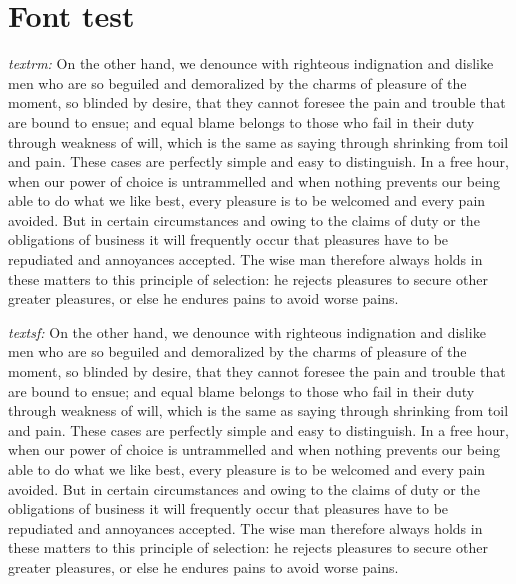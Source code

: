 \chapter*{Font test}

\emph{textrm:}
\textrm{On the other hand, we denounce with righteous indignation and
  dislike men who are so beguiled and demoralized by the charms of
  pleasure of the moment, so blinded by desire, that they cannot
  foresee the pain and trouble that are bound to ensue; and equal
  blame belongs to those who fail in their duty through weakness of
  will, which is the same as saying through shrinking from toil and
  pain. These cases are perfectly simple and easy to distinguish. In a
  free hour, when our power of choice is untrammelled and when nothing
  prevents our being able to do what we like best, every pleasure is
  to be welcomed and every pain avoided. But in certain circumstances
  and owing to the claims of duty or the obligations of business it
  will frequently occur that pleasures have to be repudiated and
  annoyances accepted. The wise man therefore always holds in these
  matters to this principle of selection: he rejects pleasures to
  secure other greater pleasures, or else he endures pains to avoid
  worse pains.}

\pagebreak 

   

\pagebreak 
\emph{textsf:}
\textsf{On the other hand, we denounce with righteous indignation and
  dislike men who are so beguiled and demoralized by the charms of
  pleasure of the moment, so blinded by desire, that they cannot
  foresee the pain and trouble that are bound to ensue; and equal
  blame belongs to those who fail in their duty through weakness of
  will, which is the same as saying through shrinking from toil and
  pain. These cases are perfectly simple and easy to distinguish. In a
  free hour, when our power of choice is untrammelled and when nothing
  prevents our being able to do what we like best, every pleasure is
  to be welcomed and every pain avoided. But in certain circumstances
  and owing to the claims of duty or the obligations of business it
  will frequently occur that pleasures have to be repudiated and
  annoyances accepted. The wise man therefore always holds in these
  matters to this principle of selection: he rejects pleasures to
  secure other greater pleasures, or else he endures pains to avoid
  worse pains.}

